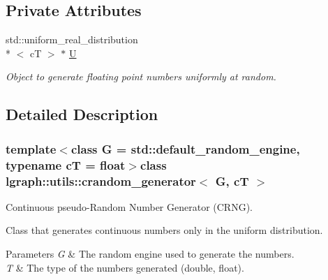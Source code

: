 \subsection*{Private Attributes}
\begin{DoxyCompactItemize}
\item 
\hypertarget{classlgraph_1_1utils_1_1crandom__generator_adf5cffef2c6372c6fcafa7b461428cb1}{std\-::uniform\-\_\-real\-\_\-distribution\\*
$<$ c\-T $>$ $\ast$ \hyperlink{classlgraph_1_1utils_1_1crandom__generator_adf5cffef2c6372c6fcafa7b461428cb1}{U}}\label{classlgraph_1_1utils_1_1crandom__generator_adf5cffef2c6372c6fcafa7b461428cb1}

\begin{DoxyCompactList}\small\item\em Object to generate floating point numbers uniformly at random. \end{DoxyCompactList}\end{DoxyCompactItemize}


\subsection{Detailed Description}
\subsubsection*{template$<$class G = std\-::default\-\_\-random\-\_\-engine, typename c\-T = float$>$class lgraph\-::utils\-::crandom\-\_\-generator$<$ G, c\-T $>$}

Continuous pseudo-\/\-Random Number Generator (C\-R\-N\-G). 

Class that generates continuous numbers only in the uniform distribution.


\begin{DoxyParams}{Parameters}
{\em G} & The random engine used to generate the numbers. \\
\hline
{\em T} & The type of the numbers generated (double, float). \\
\hline
\end{DoxyParams}


